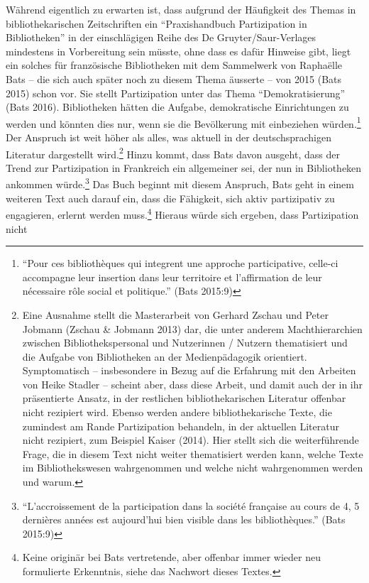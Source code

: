 \documentclass[a4paper,
fontsize=11pt,
oneside,
numbers=noperiodatend,
parskip=half-,
bibliography=totoc,
final
]{scrartcl}
\begin{document}
Während eigentlich zu erwarten ist, dass aufgrund der Häufigkeit des
Themas in bibliothekarischen Zeitschriften ein \enquote{Praxishandbuch
Partizipation in Bibliotheken} in der einschlägigen Reihe des De
Gruyter/Saur-Verlages mindestens in Vorbereitung sein müsste, ohne dass
es dafür Hinweise gibt, liegt ein solches für französische Bibliotheken
mit dem Sammelwerk von Raphaëlle Bats -- die sich auch später noch zu
diesem Thema äusserte -- von 2015 (Bats 2015) schon vor. Sie stellt
Partizipation unter das Thema \enquote{Demokratisierung} (Bats 2016).
Bibliotheken hätten die Aufgabe, demokratische Einrichtungen zu werden
und könnten dies nur, wenn sie die Bevölkerung mit einbeziehen
würden.\footnote{\enquote{Pour ces bibliothèques qui integrent une
  approche participative, celle-ci accompagne leur insertion dans leur
  territoire et l'affirmation de leur nécessaire rôle social et
  politique.} (Bats 2015:9)} Der Anspruch ist weit höher als alles, was
aktuell in der deutschsprachigen Literatur dargestellt wird.\footnote{Eine
  Ausnahme stellt die Masterarbeit von Gerhard Zschau und Peter Jobmann
  (Zschau \& Jobmann 2013) dar, die unter anderem Machthierarchien
  zwischen Bibliothekspersonal und Nutzerinnen / Nutzern thematisiert
  und die Aufgabe von Bibliotheken an der Medienpädagogik orientiert.
  Symptomatisch -- insbesondere in Bezug auf die Erfahrung mit den
  Arbeiten von Heike Stadler -- scheint aber, dass diese Arbeit, und
  damit auch der in ihr präsentierte Ansatz, in der restlichen
  bibliothekarischen Literatur offenbar nicht rezipiert wird. Ebenso
  werden andere bibliothekarische Texte, die zumindest am Rande
  Partizipation behandeln, in der aktuellen Literatur nicht rezipiert,
  zum Beispiel Kaiser (2014). Hier stellt sich die weiterführende Frage,
  die in diesem Text nicht weiter thematisiert werden kann, welche Texte
  im Bibliothekswesen wahrgenommen und welche nicht wahrgenommen werden
  und warum.} Hinzu kommt, dass Bats davon ausgeht, dass der Trend zur
Partizipation in Frankreich ein allgemeiner sei, der nun in Bibliotheken
ankommen würde.\footnote{\enquote{L'accroissement de la participation
  dans la société française au cours de 4, 5 dernières années est
  aujourd'hui bien visible dans les bibliothèques.} (Bats 2015:9)} Das
Buch beginnt mit diesem Anspruch, Bats geht in einem weiteren Text auch
darauf ein, dass die Fähigkeit, sich aktiv partizipativ zu engagieren,
erlernt werden muss.\footnote{Keine originär bei Bats vertretende, aber
  offenbar immer wieder neu formulierte Erkenntnis, siehe das Nachwort
  dieses Textes.} Hieraus würde sich ergeben, dass Partizipation nicht
\end{document}
